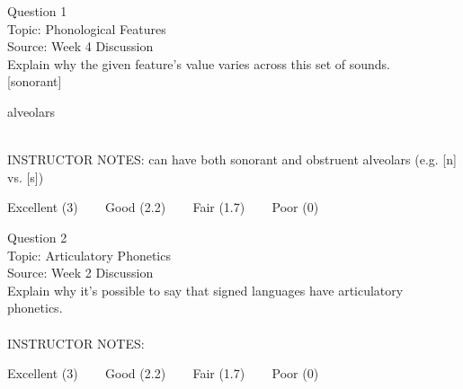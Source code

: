 \documentclass[12pt]{article}
\begin{document}
\begin{center}
\textbf{{\color{violet}{\HUGE 20210602 Wednesday\\}}}

\textbf{{\color{violet}{\HUGE ALL EXAMS (with notes)\\}}}

\end{center}
\newpage

\begin{center}
\textbf{{\color{blue}{\HUGE START OF EXAM\\}}}

\textbf{{\color{blue}{\HUGE Student ID: 23100\\}}}

\textbf{{\color{blue}{\HUGE 9:00\\}}}

\end{center}
\newpage

{\large Question 1}\\

Topic: Phonological Features\\
Source: Week 4 Discussion\\

Explain why the given feature's value varies across this set of sounds.\\

{[sonorant]}

alveolars


~\\
INSTRUCTOR NOTES: can have both sonorant and obstruent alveolars (e.g. [n] vs. [s])


\vfill
Excellent (3) ~~~ Good (2.2) ~~~ Fair (1.7) ~~~ Poor (0)
\newpage

{\large Question 2}\\

Topic: Articulatory Phonetics\\
Source: Week 2 Discussion\\

Explain why it's possible to say that signed languages have articulatory phonetics.\\


~\\
INSTRUCTOR NOTES: 


\vfill
Excellent (3) ~~~ Good (2.2) ~~~ Fair (1.7) ~~~ Poor (0)
\newpage

\begin{center}
\textbf{{\color{red}{\HUGE END OF EXAM}}}\\

\end{center}
\newpage
\end{document}
